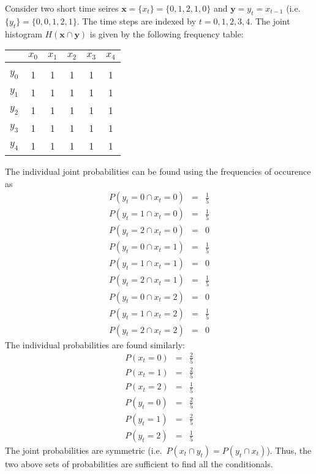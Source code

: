 \documentclass[a4paper,11pt]{article}
\begin{document}
Consider two short time seires $\mathbf{x}=\{x_t\} = \{0,1,2,1,0\}$ and $\mathbf{y}=y_t=x_{t-1}$ (i.e.\ $\{y_t\} = \{0,0,1,2,1\}$.  The time steps are indexed by $t=0,1,2,3,4$.  The joint histogram $H(\mathbf{x}\cap\mathbf{y})$ is given by the following frequency table:
\begin{center}
\begin{tabular}{l|ccccc}
 & $x_0$ & $x_1$ & $x_2$ & $x_3$ & $x_4$ \\
 \hline \\
 $y_0$ & 1 & 1 & 1 & 1 & 1\\
 $y_1$ & 1 & 1 & 1 & 1 & 1\\
 $y_2$ & 1 & 1 & 1 & 1 & 1\\
 $y_3$ & 1 & 1 & 1 & 1 & 1\\
 $y_4$ & 1 & 1 & 1 & 1 & 1\\
\end{tabular}
\end{center}
The individual joint probabilities can be found using the frequencies of occurence as
\begin{eqnarray}
P(y_t=0 \cap x_t = 0) &=& \frac{1}{5}\\
P(y_t=1 \cap x_t = 0) &=& \frac{1}{5}\\
P(y_t=2 \cap x_t = 0) &=& 0\\
P(y_t=0 \cap x_t = 1) &=& \frac{1}{5}\\
P(y_t=1 \cap x_t = 1) &=& 0\\
P(y_t=2 \cap x_t = 1) &=& \frac{1}{5}\\
P(y_t=0 \cap x_t = 2) &=& 0\\
P(y_t=1 \cap x_t = 2) &=& \frac{1}{5}\\
P(y_t=2 \cap x_t = 2) &=& 0
\end{eqnarray}
The individual probabilities are found similarly:
\begin{eqnarray}
P(x_t = 0) &=& \frac{2}{5}\\
P(x_t = 1) &=& \frac{2}{5}\\
P(x_t = 2) &=& \frac{1}{5}\\
P(y_t = 0) &=& \frac{2}{5}\\
P(y_t = 1) &=& \frac{2}{5}\\
P(y_t = 2) &=& \frac{1}{5}
\end{eqnarray}
The joint probabilities are symmetric (i.e.\ $P(x_t\cap y_t) = P(y_t\cap x_t)$).  Thus, the two above sets of probabilities are sufficient to find all the conditionals.  
\end{document}
